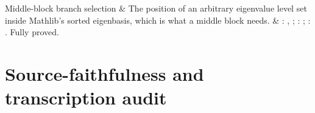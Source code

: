 \begin{formalizationmap}
Middle-block branch selection & The position of an arbitrary eigenvalue level set inside Mathlib's sorted eigenbasis, which is what a middle block needs. & : , ; : ; : . Fully proved. \\
\end{formalizationmap}

\section{Source-faithfulness and transcription audit}

